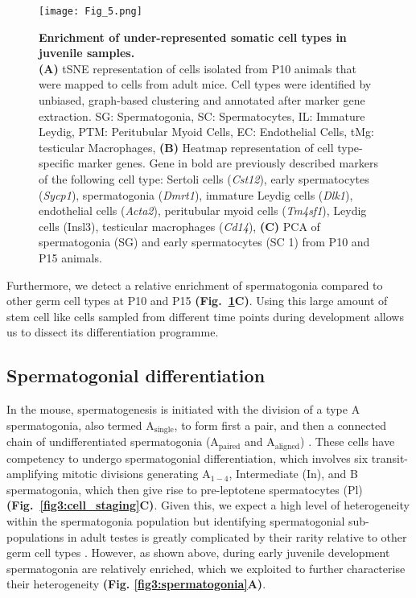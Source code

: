 \begin{figure}[!h]
\centering
\texttt{[image: Fig\_5.png]}
\caption[Enrichment of under-represented somatic cell types in juvenile samples]{\textbf{Enrichment of under-represented somatic cell types in juvenile samples.} \\
\textbf{(A)} tSNE representation of cells isolated from P10 animals that were mapped to cells from adult mice. 
Cell types were identified by unbiased, graph-based clustering and annotated after marker gene extraction. 
SG: Spermatogonia, SC: Spermatocytes, IL: Immature Leydig, PTM: Peritubular Myoid Cells, EC: Endothelial Cells, tMg: testicular Macrophages, 
\textbf{(B)} Heatmap representation of cell type-specific marker genes. Gene in bold are previously described markers of the following cell type: Sertoli cells (\textit{Cst12}), early spermatocytes (\textit{Sycp1}), spermatogonia (\textit{Dmrt1}), immature Leydig cells (\textit{Dlk1}), endothelial cells (\textit{Acta2}), peritubular myoid cells (\textit{Tm4sf1}), Leydig cells (Insl3), testicular macrophages (\textit{Cd14}), \textbf{(C)} PCA of spermatogonia (SG) and early spermatocytes (SC 1) from P10 and P15 animals. 
}
\label{fig3:somatic_cells}
\end{figure}

Furthermore, we detect a relative enrichment of spermatogonia compared to other germ cell types at P10 and P15 \textbf{(Fig.~\ref{fig3:somatic_cells}C)}. 
Using this large amount of stem cell like cells sampled from different time points during development allows us to dissect its differentiation programme.

\newpage

\subsection{Spermatogonial differentiation}

In the mouse, spermatogenesis is initiated with the division of a type A spermatogonia, also termed A$_{\text{single}}$, to form first a pair, and then a connected chain of undifferentiated spermatogonia (A$_{\text{paired}}$ and A$_{\text{aligned}}$) \citep{Oakberg1971, DeRooij1973}. 
These cells have competency to undergo spermatogonial differentiation, which involves six transit-amplifying mitotic divisions generating A$_{1-4}$, Intermediate (In), and B spermatogonia, which then give rise to pre-leptotene spermatocytes (Pl) \citep{DeRooij2000} \textbf{(Fig.~\ref{fig3:cell_staging}C)}. 
Given this, we expect a high level of heterogeneity within the spermatogonia population but identifying spermatogonial sub-populations in adult testes is greatly complicated by their rarity relative to other germ cell types \citep{Lukassen2018}. 
However, as shown above, during early juvenile development spermatogonia are relatively enriched, which we exploited to further characterise their heterogeneity \textbf{(Fig. \ref{fig3:spermatogonia}A)}. \\

